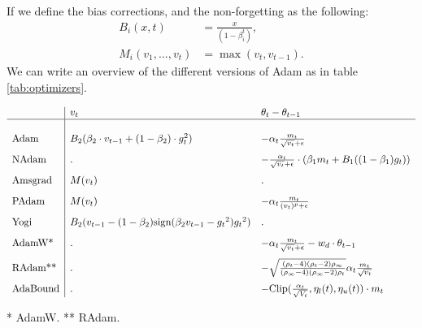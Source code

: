 If we define the bias corrections, and the non-forgetting as the following:
\begin{align}
	B_{i}(x,t) &= \frac{x}{(1-\beta_{i}^{t})}, \\
	M_{i}(v_1,...,v_t) &= \max (v_t, v_{t-1}).
\end{align}
We can write an overview of the different versions of \ac{Adam} as in table \ref{tab:optimizers}.
\begin{table}
	
	$
	\begin{array}{l|ll}
		&  v_t & \theta_t - \theta_{t-1}  \\
		\hline\\[0.5mm]
		\text{Adam}    & B_2(\beta_2 \cdot v_{t-1} + (1-\beta_2) \cdot g_{t}^2)
		&  - \alpha_t \frac{m_t}{\sqrt{{v_t}} + \epsilon} \\[3mm]
		\text{NAdam}  & . & -  \frac{\alpha_t}{\sqrt{v_t} + \epsilon} \cdot (\beta_1 m_t  + B_1((1-\beta_1) g_t)) \\[3mm]
		\text{Amsgrad}  & M(v_t) & . \\[3mm]
		\text{PAdam}  & M(v_t) & - \alpha_t \frac{m_t}{(v_t)^p + \epsilon} \\[3mm]
		\text{Yogi}  & B_2(v_{t-1} - (1-\beta_{2}) \text{sign}(\beta_2 v_{t-1} - {g_t}^2) {g_t}^2) & . \\[3mm]
		\text{AdamW*} & . & - \alpha_t \frac{m_t}{\sqrt{{v_t}} + \epsilon} - w_d \cdot \theta_{t-1}\\[3mm]
		\text{RAdam**}  & . & - \sqrt{\frac{(\rho_t - 4)(\rho_t - 2)\rho_\infty}{(\rho_\infty - 4)(\rho_\infty-2)\rho_t}} \alpha_t \frac{m_t}{\sqrt{{v_t}}} \\[3mm]
		\text{AdaBound}  & . & - \text{Clip}(\frac{\alpha_t}{\sqrt{V_t}},\eta_l(t), \eta_u(t) ) \cdot m_t
	\end{array}
	$
	\caption{* AdamW. ** RAdam.}
	\label{tab:optimizers}
\end{table}